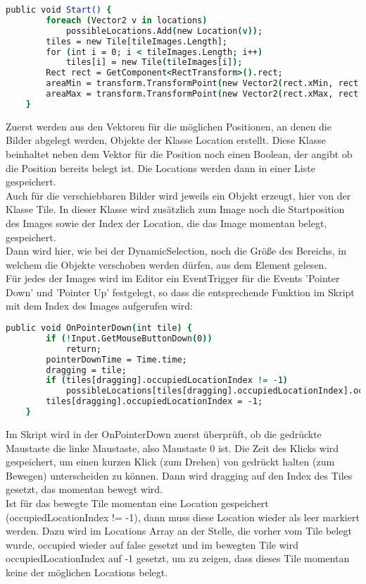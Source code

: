 {\begin{lstlisting}[language=csh, caption={Start Methode des SnapDragControllers}]
public void Start() {
        foreach (Vector2 v in locations)
            possibleLocations.Add(new Location(v));
        tiles = new Tile[tileImages.Length];
        for (int i = 0; i < tileImages.Length; i++)
            tiles[i] = new Tile(tileImages[i]);
        Rect rect = GetComponent<RectTransform>().rect;
        areaMin = transform.TransformPoint(new Vector2(rect.xMin, rect.yMin));
        areaMax = transform.TransformPoint(new Vector2(rect.xMax, rect.yMax));
    }
\end{lstlisting}
Zuerst werden aus den Vektoren für die möglichen Positionen, an denen die Bilder abgelegt werden, Objekte der Klasse Location erstellt. Diese Klasse beinhaltet neben dem Vektor für die Position noch einen Boolean, der angibt ob die Position bereits belegt ist. Die Locations werden dann in einer Liste gespeichert.\\
Auch für die verschiebbaren Bilder wird jeweils ein Objekt erzeugt, hier von der Klasse Tile. In dieser Klasse wird zusätzlich zum Image noch die Startposition des Images sowie der Index der Location, die das Image momentan belegt, gespeichert.\\
Dann wird hier, wie bei der DynamicSelection, noch die Größe des Bereichs, in welchem die Objekte verschoben werden dürfen, aus dem Element gelesen.\\

Für jedes der Images wird im Editor ein EventTrigger für die Events 'Pointer Down' und 'Pointer Up' festgelegt, so dass die entsprechende Funktion im Skript mit dem Index des Images aufgerufen wird:

\begin{lstlisting}[language=csh, caption={OnPointerDown Methode des SnapDragControllers}]
 public void OnPointerDown(int tile) {
        if (!Input.GetMouseButtonDown(0))
            return;
        pointerDownTime = Time.time;
        dragging = tile;
        if (tiles[dragging].occupiedLocationIndex != -1)
            possibleLocations[tiles[dragging].occupiedLocationIndex].occupied = false;
        tiles[dragging].occupiedLocationIndex = -1;
    }

\end{lstlisting}
Im Skript wird in der OnPointerDown zuerst überprüft, ob die gedrückte Maustaste die linke Maustaste, also Maustaste 0 ist. Die Zeit des Klicks wird gespeichert, um einen kurzen Klick (zum Drehen) von gedrückt halten (zum Bewegen) unterscheiden zu können. Dann wird dragging auf den Index des Tiles gesetzt, das momentan bewegt wird.\\
Ist für das bewegte Tile momentan eine Location gespeichert (occupiedLocationIndex != -1), dann muss diese Location wieder als leer markiert werden. Dazu wird im Locations Array an der Stelle, die vorher vom Tile belegt wurde, occupied wieder auf false gesetzt und im bewegten Tile wird occupiedLocationIndex auf -1 gesetzt, um zu zeigen, dass dieses Tile momentan keine der möglichen Locations belegt.\\

}
